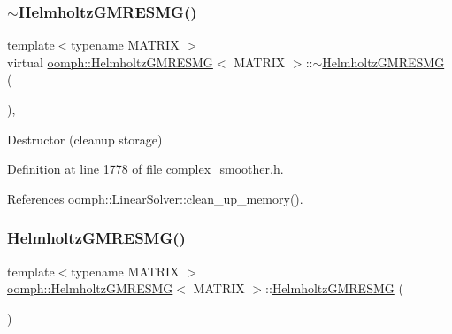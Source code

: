 \mbox{\label{classoomph_1_1HelmholtzGMRESMG_aa8bdb804033f8050742706589cd8a072}} 
\subsubsection{\texorpdfstring{$\sim$\+Helmholtz\+G\+M\+R\+E\+S\+M\+G()}{~HelmholtzGMRESMG()}}
{\footnotesize\ttfamily template$<$typename M\+A\+T\+R\+IX $>$ \\
virtual \hyperlink{classoomph_1_1HelmholtzGMRESMG}{oomph\+::\+Helmholtz\+G\+M\+R\+E\+S\+MG}$<$ M\+A\+T\+R\+IX $>$\+::$\sim$\hyperlink{classoomph_1_1HelmholtzGMRESMG}{Helmholtz\+G\+M\+R\+E\+S\+MG} (\begin{DoxyParamCaption}{ }\end{DoxyParamCaption})\hspace{0.3cm}{\ttfamily [inline]}, {\ttfamily [virtual]}}



Destructor (cleanup storage) 



Definition at line 1778 of file complex\+\_\+smoother.\+h.



References oomph\+::\+Linear\+Solver\+::clean\+\_\+up\+\_\+memory().

\mbox{\label{classoomph_1_1HelmholtzGMRESMG_aa1e9e5ec373b7dd34787f84f5b518987}} 
\subsubsection{\texorpdfstring{Helmholtz\+G\+M\+R\+E\+S\+M\+G()}{HelmholtzGMRESMG()}\hspace{0.1cm}{\footnotesize\ttfamily [2/2]}}
{\footnotesize\ttfamily template$<$typename M\+A\+T\+R\+IX $>$ \\
\hyperlink{classoomph_1_1HelmholtzGMRESMG}{oomph\+::\+Helmholtz\+G\+M\+R\+E\+S\+MG}$<$ M\+A\+T\+R\+IX $>$\+::\hyperlink{classoomph_1_1HelmholtzGMRESMG}{Helmholtz\+G\+M\+R\+E\+S\+MG} (\begin{DoxyParamCaption}\item[{const \hyperlink{classoomph_1_1HelmholtzGMRESMG}{Helmholtz\+G\+M\+R\+E\+S\+MG}$<$ M\+A\+T\+R\+IX $>$ \&}]{ }\end{DoxyParamCaption})\hspace{0.3cm}{\ttfamily [inline]}}



